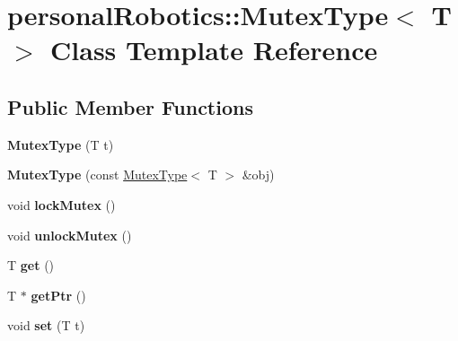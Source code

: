 \hypertarget{classpersonal_robotics_1_1_mutex_type}{}\section{personal\+Robotics\+:\+:Mutex\+Type$<$ T $>$ Class Template Reference}
\label{classpersonal_robotics_1_1_mutex_type}
\subsection*{Public Member Functions}
\begin{DoxyCompactItemize}
\item 
\hypertarget{classpersonal_robotics_1_1_mutex_type_af04fa104e774b42f8f70e053e7f9dc18}{}{\bfseries Mutex\+Type} (T t)\label{classpersonal_robotics_1_1_mutex_type_af04fa104e774b42f8f70e053e7f9dc18}

\item 
\hypertarget{classpersonal_robotics_1_1_mutex_type_a32d87352efdb69e486bfd7ebdf8d5255}{}{\bfseries Mutex\+Type} (const \hyperlink{classpersonal_robotics_1_1_mutex_type}{Mutex\+Type}$<$ T $>$ \&obj)\label{classpersonal_robotics_1_1_mutex_type_a32d87352efdb69e486bfd7ebdf8d5255}

\item 
\hypertarget{classpersonal_robotics_1_1_mutex_type_a3cffd1d15ceb2a3f11e2be4363f3eaa5}{}void {\bfseries lock\+Mutex} ()\label{classpersonal_robotics_1_1_mutex_type_a3cffd1d15ceb2a3f11e2be4363f3eaa5}

\item 
\hypertarget{classpersonal_robotics_1_1_mutex_type_ae67a782ecb9d1edbfe7c06b0624254e9}{}void {\bfseries unlock\+Mutex} ()\label{classpersonal_robotics_1_1_mutex_type_ae67a782ecb9d1edbfe7c06b0624254e9}

\item 
\hypertarget{classpersonal_robotics_1_1_mutex_type_a4760b981b8fedccde8d0c2c2449735f1}{}T {\bfseries get} ()\label{classpersonal_robotics_1_1_mutex_type_a4760b981b8fedccde8d0c2c2449735f1}

\item 
\hypertarget{classpersonal_robotics_1_1_mutex_type_a4908187bb76a498509e9020c74d4afe8}{}T $\ast$ {\bfseries get\+Ptr} ()\label{classpersonal_robotics_1_1_mutex_type_a4908187bb76a498509e9020c74d4afe8}

\item 
\hypertarget{classpersonal_robotics_1_1_mutex_type_a9e51362c2cae90ef893eccfdbb63302f}{}void {\bfseries set} (T t)\label{classpersonal_robotics_1_1_mutex_type_a9e51362c2cae90ef893eccfdbb63302f}


\end{DoxyCompactItemize}
